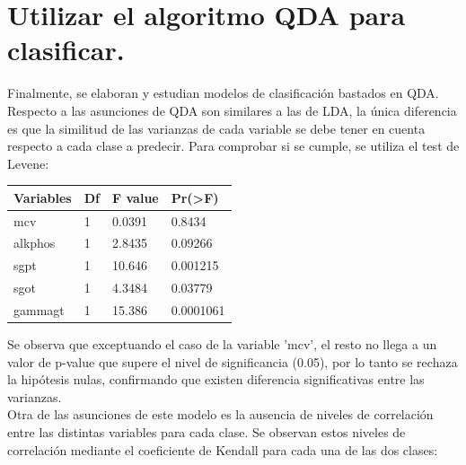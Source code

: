 \vspace{1cm}
\section{Utilizar el algoritmo QDA para clasificar.}
Finalmente, se elaboran y estudian modelos de clasificación bastados en QDA.
Respecto a las asunciones de QDA son similares a las de LDA, la única diferencia es que la similitud de las varianzas de cada variable se debe tener en cuenta respecto a cada clase a predecir. Para comprobar si se cumple, se utiliza el test de Levene:
\begin{table}[!h]
	\centering
	\begin{tabular}{l|lll}
		Variables & Df & F value & Pr(\textgreater{}F) \\ \hline
		mcv       & 1  & 0.0391  & 0.8434              \\
		alkphos   & 1  & 2.8435  & 0.09266             \\
		sgpt      & 1  & 10.646  & 0.001215            \\
		sgot      & 1  & 4.3484  & 0.03779             \\
		gammagt   & 1  & 15.386  & 0.0001061          
	\end{tabular}
\end{table}

Se observa que exceptuando el caso de la variable 'mcv', el resto no llega a un valor de p-value que supere el nivel de significancia (0.05), por lo tanto se rechaza la hipótesis nulas, confirmando que existen diferencia significativas entre las varianzas.\\

Otra de las asunciones de este modelo es la ausencia de niveles de correlación entre las distintas variables para cada clase. Se observan estos niveles de correlación mediante el coeficiente de Kendall para cada una de las dos clases:

